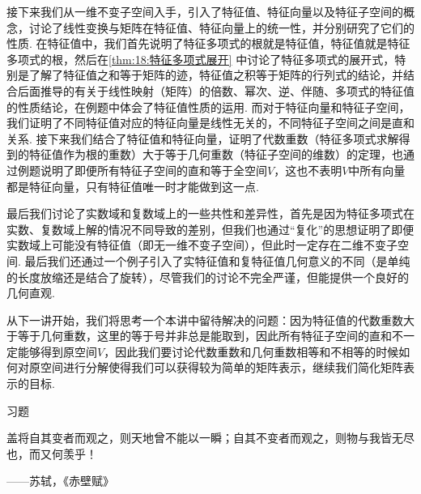 接下来我们从一维不变子空间入手，引入了特征值、特征向量以及特征子空间的概念，讨论了线性变换与矩阵在特征值、特征向量上的统一性，并分别研究了它们的性质. 在特征值中，我们首先说明了特征多项式的根就是特征值，特征值就是特征多项式的根，然后在\autoref{thm:18:特征多项式展开} 中讨论了特征多项式的展开式，特别是了解了特征值之和等于矩阵的迹，特征值之积等于矩阵的行列式的结论，并结合后面推导的有关于线性映射（矩阵）的倍数、幂次、逆、伴随、多项式的特征值的性质结论，在例题中体会了特征值性质的运用. 而对于特征向量和特征子空间，我们证明了不同特征值对应的特征向量是线性无关的，不同特征子空间之间是直和关系. 接下来我们结合了特征值和特征向量，证明了代数重数（特征多项式求解得到的特征值作为根的重数）大于等于几何重数（特征子空间的维数）的定理，也通过例题说明了即便所有特征子空间的直和等于全空间$V$，这也不表明$V$中所有向量都是特征向量，只有特征值唯一时才能做到这一点.

最后我们讨论了实数域和复数域上的一些共性和差异性，首先是因为特征多项式在实数、复数域上解的情况不同导致的差别，但我们也通过``复化''的思想证明了即便实数域上可能没有特征值（即无一维不变子空间），但此时一定存在二维不变子空间. 最后我们还通过一个例子引入了实特征值和复特征值几何意义的不同（是单纯的长度放缩还是结合了旋转），尽管我们的讨论不完全严谨，但能提供一个良好的几何直观.

从下一讲开始，我们将思考一个本讲中留待解决的问题：因为特征值的代数重数大于等于几何重数，这里的等于号并非总是能取到，因此所有特征子空间的直和不一定能够得到原空间$V$，因此我们要讨论代数重数和几何重数相等和不相等的时候如何对原空间进行分解使得我们可以获得较为简单的矩阵表示，继续我们简化矩阵表示的目标.

\vspace{2ex}
\centerline{\heiti \Large 习题}

\vspace{2ex}
{\kaishu 盖将自其变者而观之，则天地曾不能以一瞬；自其不变者而观之，则物与我皆无尽也，而又何羡乎！}
\begin{flushright}
    \kaishu
    ——苏轼，《赤壁赋》
\end{flushright}

